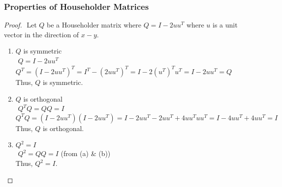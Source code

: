 \documentclass[12pt]{article}
\begin{document}
\subsubsection{Properties of Householder Matrices}
\begin{proof} $ $\newline
Let $Q$ be a Householder matrix where $Q = I - 2uu^T$ where $u$ is a unit vector in the direction of $x-y$. \\
\begin{enumerate}[label=(\alph*)]
    \item $Q$ is symmetric \\
        $ $\newline
        $Q = I - 2uu^T$ \\
        $Q^T = (I - 2uu^T)^T = I^T - (2uu^T)^T = I - 2(u^T)^Tu^T = I - 2uu^T = Q$ \\
        Thus, $Q$ is symmetric.

    \item $Q$ is orthogonal \\
        $ $\newline
        $Q^TQ = QQ = I$ \\
        $Q^TQ = (I - 2uu^T)(I - 2uu^T) = I - 2uu^T - 2uu^T + 4uu^Tuu^T = I - 4uu^T + 4uu^T = I$ \\
        Thus, $Q$ is orthogonal.
    \item $Q^2 = I$ \\
        $ $\newline
        $Q^2 = QQ = I $ (from (a) \& (b)) \\
        Thus, $Q^2 = I$.
\end{enumerate}
\end{proof}
\end{document}
